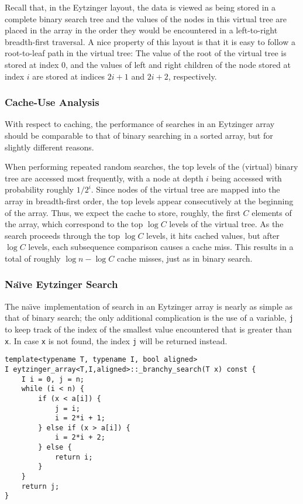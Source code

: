 \documentclass{patmorin}
\newcommand{\naive}{na\"{\i}ve}
\begin{document}
Recall that, in the Eytzinger layout, the data is viewed as being
stored in a complete binary search tree and the values of the nodes in
this virtual tree are placed in the array in the order they would be
encountered in a left-to-right breadth-first traversal.  A nice property
of this layout is that it is easy to follow a root-to-leaf path in the
virtual tree: The value of the root of the virtual tree is stored at
index 0, and the values of left and right children of the node stored
at index $i$ are stored at indices $2i+1$ and $2i+2$, respectively.


\subsubsection{Cache-Use Analysis}

With respect to caching, the performance of searches in an Eytzinger
array should be comparable to that of binary searching in a sorted array,
but for slightly different reasons.

When performing repeated random searches, the top levels of the (virtual)
binary tree are accessed most frequently, with a node at depth $i$
being accessed with probability roughly $1/2^i$.  Since nodes of the
virtual tree are mapped into the array in breadth-first order, the
top levels appear consecutively at the beginning of the array. Thus,
we expect the cache to store, roughly, the first $C$ elements of the
array, which correspond to the top $\log C$ levels of the virtual tree.
As the search proceeds through the top $\log C$ levels, it hits cached
values, but after $\log C$ levels, each subsequence comparison causes
a cache miss.  This results in a total of roughly $\log n-\log C$ cache
misses, just as in binary search.

\subsubsection{Na\"{\i}ve Eytzinger Search}

The \naive\ implementation of search in an Eytzinger array is nearly
as simple as that of binary search; the only additional complication is
the use of a variable, \texttt{j} to keep track of the index
of the smallest value encountered that is greater than \texttt{x}.
In case \texttt{x} is not found, the index \texttt{j}
will be returned instead.

\begin{listing}
\begin{verbatim}
template<typename T, typename I, bool aligned>
I eytzinger_array<T,I,aligned>::_branchy_search(T x) const {
	I i = 0, j = n;
	while (i < n) {
		if (x < a[i]) {
			j = i;
			i = 2*i + 1;
		} else if (x > a[i]) {
			i = 2*i + 2;
		} else {
			return i;
		}
	}
	return j;
}
\end{verbatim}
\caption{A \naive\ implementation of search in an Eytzinger array.}
\end{listing}
\end{document}
